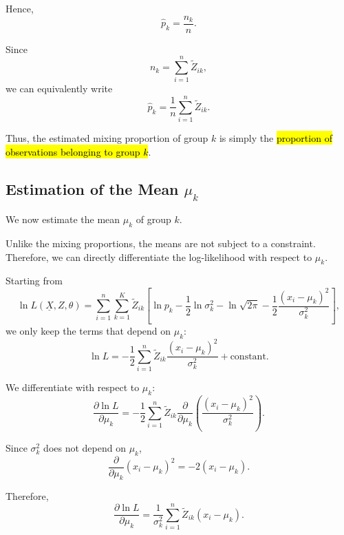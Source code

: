 Hence,
\begin{equation*}
\boxed{
\hat{p}_k=\frac{n_k}{n}
}.
\end{equation*}

Since
\begin{equation*}
n_k=\sum_{i=1}^n\tilde{Z}_{ik},
\end{equation*}
we can equivalently write
\begin{equation*}
\boxed{
\hat{p}_k
=
\frac{1}{n}
\sum_{i=1}^n\tilde{Z}_{ik}
}.
\end{equation*}

Thus, the estimated mixing proportion of group $k$ is simply the
\hl{proportion of observations belonging to group $k$}.

\subsection{Estimation of the Mean $\mu_k$}

We now estimate the mean $\mu_k$ of group $k$.

Unlike the mixing proportions, the means are not subject to a
constraint. Therefore, we can directly differentiate the
log-likelihood with respect to $\mu_k$.

Starting from
\begin{equation*}
\ln L(\underline{X},Z,\theta)
=
\sum_{i=1}^{n}\sum_{k=1}^{K}
\tilde{Z}_{ik}
\left[
\ln p_k
-\frac{1}{2}\ln\sigma_k^2
-\ln\sqrt{2\pi}
-\frac{1}{2}
\frac{(x_i-\mu_k)^2}{\sigma_k^2}
\right],
\end{equation*}
we only keep the terms that depend on $\mu_k$:
\begin{equation*}
\ln L
=
-\frac{1}{2}
\sum_{i=1}^n
\tilde{Z}_{ik}
\frac{(x_i-\mu_k)^2}{\sigma_k^2}
+
\text{constant}.
\end{equation*}

We differentiate with respect to $\mu_k$:
\begin{equation*}
\frac{\partial\ln L}{\partial\mu_k}
=
-\frac{1}{2}
\sum_{i=1}^n
\tilde{Z}_{ik}
\frac{\partial}{\partial\mu_k}
\left(
\frac{(x_i-\mu_k)^2}{\sigma_k^2}
\right).
\end{equation*}

Since $\sigma_k^2$ does not depend on $\mu_k$,
\begin{equation*}
\frac{\partial}{\partial\mu_k}
(x_i-\mu_k)^2
=
-2(x_i-\mu_k).
\end{equation*}

Therefore,
\begin{equation*}
\frac{\partial\ln L}{\partial\mu_k}
=
\frac{1}{\sigma_k^2}
\sum_{i=1}^n
\tilde{Z}_{ik}(x_i-\mu_k).
\end{equation*}

